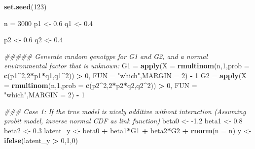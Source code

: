 \documentclass[]{article}
\newenvironment{Shaded}{\begin{snugshade}}{\end{snugshade}}
\newcommand{\CommentTok}[1]{\textcolor[rgb]{0.56,0.35,0.01}{\textit{#1}}}
\newcommand{\DataTypeTok}[1]{\textcolor[rgb]{0.13,0.29,0.53}{#1}}
\newcommand{\DecValTok}[1]{\textcolor[rgb]{0.00,0.00,0.81}{#1}}
\newcommand{\FloatTok}[1]{\textcolor[rgb]{0.00,0.00,0.81}{#1}}
\newcommand{\KeywordTok}[1]{\textcolor[rgb]{0.13,0.29,0.53}{\textbf{#1}}}
\newcommand{\NormalTok}[1]{#1}
\newcommand{\OperatorTok}[1]{\textcolor[rgb]{0.81,0.36,0.00}{\textbf{#1}}}
\newcommand{\StringTok}[1]{\textcolor[rgb]{0.31,0.60,0.02}{#1}}
\begin{document}
\begin{Shaded}
\begin{Highlighting}[]
\KeywordTok{set.seed}\NormalTok{(}\DecValTok{123}\NormalTok{)}

\NormalTok{n =}\StringTok{ }\DecValTok{3000}
\NormalTok{p1 <-}\StringTok{ }\FloatTok{0.6}
\NormalTok{q1 <-}\StringTok{ }\FloatTok{0.4}

\NormalTok{p2 <-}\StringTok{ }\FloatTok{0.6}
\NormalTok{q2 <-}\StringTok{ }\FloatTok{0.4}


\CommentTok{##### Generate random genotype for G1 and G2, and a normal environmental factor that is unknown:}
\NormalTok{G1 =}\StringTok{ }\KeywordTok{apply}\NormalTok{(}\DataTypeTok{X =} \KeywordTok{rmultinom}\NormalTok{(n,}\DecValTok{1}\NormalTok{,}\DataTypeTok{prob =} \KeywordTok{c}\NormalTok{(p1}\OperatorTok{^}\DecValTok{2}\NormalTok{,}\DecValTok{2}\OperatorTok{*}\NormalTok{p1}\OperatorTok{*}\NormalTok{q1,q1}\OperatorTok{^}\DecValTok{2}\NormalTok{)) }\OperatorTok{>}\StringTok{ }\DecValTok{0}\NormalTok{, }\DataTypeTok{FUN =} \StringTok{"which"}\NormalTok{,}\DataTypeTok{MARGIN =} \DecValTok{2}\NormalTok{) }\OperatorTok{-}\StringTok{ }\DecValTok{1}
\NormalTok{G2 =}\StringTok{ }\KeywordTok{apply}\NormalTok{(}\DataTypeTok{X =} \KeywordTok{rmultinom}\NormalTok{(n,}\DecValTok{1}\NormalTok{,}\DataTypeTok{prob =} \KeywordTok{c}\NormalTok{(p2}\OperatorTok{^}\DecValTok{2}\NormalTok{,}\DecValTok{2}\OperatorTok{*}\NormalTok{p2}\OperatorTok{*}\NormalTok{q2,q2}\OperatorTok{^}\DecValTok{2}\NormalTok{)) }\OperatorTok{>}\StringTok{ }\DecValTok{0}\NormalTok{, }\DataTypeTok{FUN =} \StringTok{"which"}\NormalTok{,}\DataTypeTok{MARGIN =} \DecValTok{2}\NormalTok{) }\OperatorTok{-}\StringTok{ }\DecValTok{1}


\CommentTok{### Case 1: If the true model is nicely additive without interaction (Assuming probit model, inverse normal CDF as link function)}
\NormalTok{beta0 <-}\StringTok{ }\FloatTok{-1.2}
\NormalTok{beta1 <-}\StringTok{ }\FloatTok{0.8}
\NormalTok{beta2 <-}\StringTok{ }\FloatTok{0.3}
\NormalTok{latent_y <-}\StringTok{ }\NormalTok{beta0 }\OperatorTok{+}\StringTok{ }\NormalTok{beta1}\OperatorTok{*}\NormalTok{G1 }\OperatorTok{+}\StringTok{ }\NormalTok{beta2}\OperatorTok{*}\NormalTok{G2 }\OperatorTok{+}\StringTok{ }\KeywordTok{rnorm}\NormalTok{(}\DataTypeTok{n =}\NormalTok{ n)}
\NormalTok{y <-}\StringTok{ }\KeywordTok{ifelse}\NormalTok{(latent_y }\OperatorTok{>}\StringTok{ }\DecValTok{0}\NormalTok{,}\DecValTok{1}\NormalTok{,}\DecValTok{0}\NormalTok{)}
\end{Highlighting}
\end{Shaded}
\end{document}
